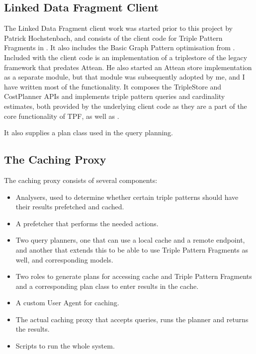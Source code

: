 \subsection{Linked Data Fragment Client}\label{sec:ldfclient}

The Linked Data Fragment client work was started prior to this project
by Patrick Hochstenbach, and consists of the client code for Triple
Pattern Fragments in . It also includes the Basic
Graph Pattern optimisation from \cite{verborgh2014querying}. Included with the client
code is an implementation of a triplestore of the legacy
 framework that predates Attean. He also started
an Attean store implementation  as a
separate module, but that module was subsequently adopted by me, and I
have written most of the functionality. It composes the \mbox{TripleStore}
and \mbox{CostPlanner} APIs and implements triple pattern queries and
cardinality estimates, both provided by the underlying client code as
they are a part of the core functionality of TPF,
as well as .

It also supplies a plan class 
used in the query planning. 

\subsection{The Caching Proxy}\label{sec:cacher}

The caching proxy consists of several components:

\begin{itemize}
\item Analysers, used to determine whether certain triple patterns
  should have their results prefetched and cached.
\item A prefetcher that performs the needed actions.
\item Two query planners, one that can use a local cache and a remote
  endpoint, and another that extends this to be able to use Triple
  Pattern Fragments as well, and corresponding models.
\item Two roles to generate plans for accessing cache and Triple
  Pattern Fragments and a corresponding plan class to enter results
  in the cache.
\item A custom User Agent for caching.
\item The actual caching proxy that accepts queries, runs the planner
  and returns the results.
\item Scripts to run the whole system.
\end{itemize}

